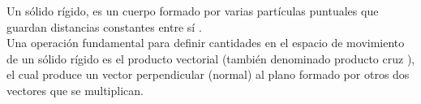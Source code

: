 \label{anexoA}
Un sólido rígido, es un cuerpo formado por varias partículas puntuales que
guardan distancias constantes entre sí .\\

Una operación fundamental para definir cantidades en el espacio de movimiento de
un sólido rígido es el producto vectorial (también denominado producto cruz ),
el cual produce un vector perpendicular (normal) al plano formado por otros dos vectores
que se multiplican.\\

